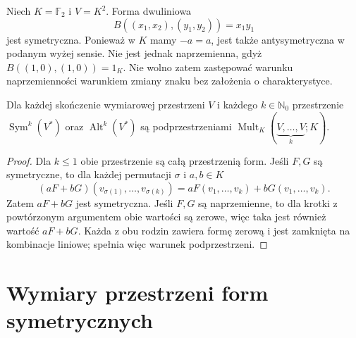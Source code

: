 \begin{przyklad}
\label{prz:lin8-char2}
Niech \(K=\mathbb F_2\) i \(V=K^2\).
Forma dwuliniowa
\[
 B((x_1,x_2),(y_1,y_2))=x_1y_1
\]
jest symetryczna.
Ponieważ w \(K\) mamy \(-a=a\),
jest także antysymetryczna
w podanym wyżej sensie.
Nie jest jednak naprzemienna,
gdyż \(B((1,0),(1,0))=1_K\).
Nie wolno zatem zastępować
warunku naprzemienności
warunkiem zmiany znaku
bez założenia o charakterystyce.
\end{przyklad}

\begin{stwierdzenie}
\label{prop:lin8-sym-alt-podprzestrzenie}
Dla każdej skończenie wymiarowej
przestrzeni \(V\) i każdego
\(k\in\mathbb N_0\)
przestrzenie
\(\operatorname{Sym}^k(V^*)\)
oraz \(\operatorname{Alt}^k(V^*)\)
są podprzestrzeniami
\(\operatorname{Mult}_K(
\underbrace{V,\ldots,V}_{k};K)\).
\end{stwierdzenie}
\begin{proof}
Dla \(k\leq1\) obie przestrzenie
są całą przestrzenią form.
Jeśli \(F,G\) są symetryczne,
to dla każdej permutacji \(\sigma\)
i \(a,b\in K\)
\[
 (aF+bG)(v_{\sigma(1)},\ldots,v_{\sigma(k)})
 =aF(v_1,\ldots,v_k)+bG(v_1,\ldots,v_k).
\]
Zatem \(aF+bG\) jest symetryczna.
Jeśli \(F,G\) są naprzemienne,
to dla krotki z powtórzonym
argumentem obie wartości są zerowe,
więc taka jest również wartość
\(aF+bG\). Każda z obu rodzin
zawiera formę zerową i jest
zamknięta na kombinacje liniowe;
spełnia więc warunek podprzestrzeni.
\end{proof}

\section{Wymiary przestrzeni form symetrycznych}
\label{sec:lin8-wymiar-sym}

